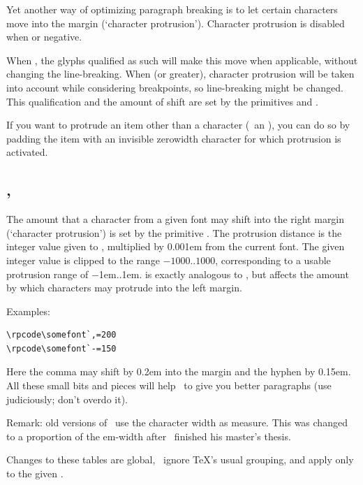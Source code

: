 \documentclass{pdftexmanual}
\begin{document}
Yet another way of optimizing paragraph breaking is to let certain
characters move into the margin (`character protrusion'). Character
protrusion is disabled when  or negative.

When , the glyphs qualified as such will make
this move when applicable, without changing the line-breaking. When
 (or greater), character protrusion will be taken
into account while considering breakpoints, so line-breaking might be
changed. This qualification and the amount of shift are set by the
primitives  and .

If you want to protrude an item other than a character (\eg\ an
), you can do so by padding the item with an invisible
zero\hyph width character for which protrusion is activated.

\subsection{, }

The amount that a character from a given font may shift into the right
margin (`character protrusion') is set by the primitive . The
protrusion distance is the integer value given to ,
multiplied by 0.001em from the current font. The given integer value is
clipped to the range $-1000..1000$, corresponding to a usable protrusion
range of $-$1em..1em.  is exactly analogous to ,
but affects the amount by which characters may protrude into the left
margin.

Examples:

\begin{verbatim}
\rpcode\somefont`,=200
\rpcode\somefont`-=150
\end{verbatim}

Here the comma may shift by 0.2em into the margin and the hyphen by
0.15em. All these small bits and pieces will help \PDFTEX\ to give
you better paragraphs (use  judiciously; don't overdo it).

Remark: old versions of \PDFTEX\ use the character width as measure. This
was changed to a proportion of the em-width after \THANH\ finished his
master's thesis.

Changes to these tables are global, \ie\ ignore \TeX's usual grouping,
and apply only to the given .
\end{document}
